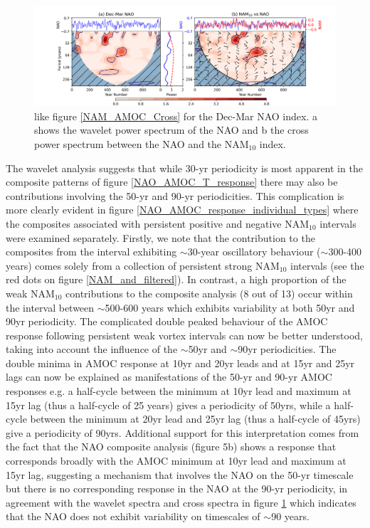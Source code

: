 \begin{figure}[h!]
\begin{center}
\noindent\includegraphics[width = \linewidth]{Figures/Figures-surface/NAM_NAO_filtered_subplot.png}
\caption{like figure \ref{NAM_AMOC_Cross} for the Dec-Mar NAO index. a shows the wavelet power spectrum of the NAO and b the cross power spectrum between the NAO and the NAM$_{10}$ index.}
\label{NAO_NAM_Cross}
\end{center}
\end{figure}

The wavelet analysis suggests that while 30-yr periodicity is most apparent in the composite patterns of figure \ref{NAO_AMOC_T_response} there may also be contributions involving the 50-yr and 90-yr periodicities. This complication is more clearly evident in figure \ref{NAO_AMOC_response_individual_types} where the composites associated with persistent positive and negative NAM$_{10}$ intervals were examined separately. Firstly, we note that the contribution to the composites from the interval exhibiting $\sim$30-year oscillatory behaviour ($\sim$300-400 years) comes solely from a collection of persistent strong NAM$_{10}$ intervals (see the red dots on figure \ref{NAM_and_filtered}). In contrast, a high proportion of the weak NAM$_{10}$ contributions to the composite analysis (8 out of 13) occur within the interval between $\sim$500-600 years which exhibits variability at both 50yr and 90yr periodicity. The complicated double peaked behaviour of the AMOC response following persistent weak vortex intervals can now be better understood, taking into account the influence of the $\sim$50yr and $\sim$90yr periodicities. The double minima in AMOC response at 10yr and 20yr leads and at 15yr and 25yr lags can now be explained as manifestations of the 50-yr and 90-yr AMOC responses e.g. a half-cycle between the minimum at 10yr lead and maximum at 15yr lag (thus a half-cycle of 25 years) gives a periodicity of 50yrs, while a half-cycle between the minimum at 20yr lead and 25yr lag (thus a half-cycle of 45yrs) give a periodicity of 90yrs.  Additional support for this interpretation comes from the fact that the NAO composite analysis (figure 5b) shows a response that corresponds broadly with the AMOC minimum at 10yr lead and maximum at 15yr lag, suggesting a mechanism that involves the NAO on the 50-yr timescale but there is no corresponding response in the NAO at the 90-yr periodicity, in agreement with  the wavelet spectra and cross spectra in figure \ref{NAO_NAM_Cross} which indicates that the NAO does not exhibit variability on timescales of $\sim$90 years. 


